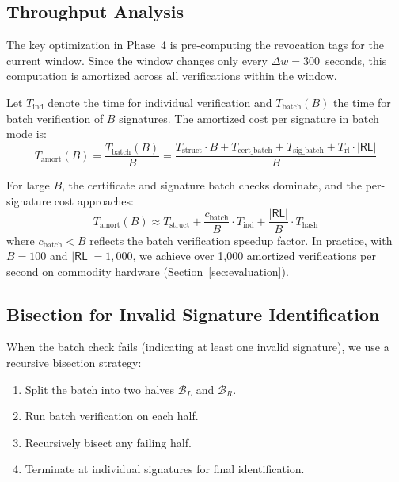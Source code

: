 \documentclass[conference,10pt]{IEEEtran}
\begin{document}
\subsection{Throughput Analysis}

The key optimization in Phase~4 is pre-computing the revocation tags for the current window. Since the window changes only every $\Delta w = 300$~seconds, this computation is amortized across all verifications within the window.

Let $T_{\mathrm{ind}}$ denote the time for individual verification and $T_{\mathrm{batch}}(B)$ the time for batch verification of $B$ signatures. The amortized cost per signature in batch mode is:
\begin{equation}
T_{\mathrm{amort}}(B) = \frac{T_{\mathrm{batch}}(B)}{B} = \frac{T_{\mathrm{struct}} \cdot B + T_{\mathrm{cert\_batch}} + T_{\mathrm{sig\_batch}} + T_{\mathrm{rl}} \cdot |\mathsf{RL}|}{B}
\end{equation}

For large $B$, the certificate and signature batch checks dominate, and the per-signature cost approaches:
\begin{equation}
T_{\mathrm{amort}}(B) \approx T_{\mathrm{struct}} + \frac{c_{\mathrm{batch}}}{B} \cdot T_{\mathrm{ind}} + \frac{|\mathsf{RL}|}{B} \cdot T_{\mathrm{hash}}
\end{equation}
where $c_{\mathrm{batch}} < B$ reflects the batch verification speedup factor. In practice, with $B = 100$ and $|\mathsf{RL}| = 1{,}000$, we achieve over 1{,}000 amortized verifications per second on commodity hardware (Section~\ref{sec:evaluation}).

\subsection{Bisection for Invalid Signature Identification}

When the batch check fails (indicating at least one invalid signature), we use a recursive bisection strategy:

\begin{enumerate}
    \item Split the batch into two halves $\mathcal{B}_L$ and $\mathcal{B}_R$.
    \item Run batch verification on each half.
    \item Recursively bisect any failing half.
    \item Terminate at individual signatures for final identification.
\end{enumerate}
\end{document}
